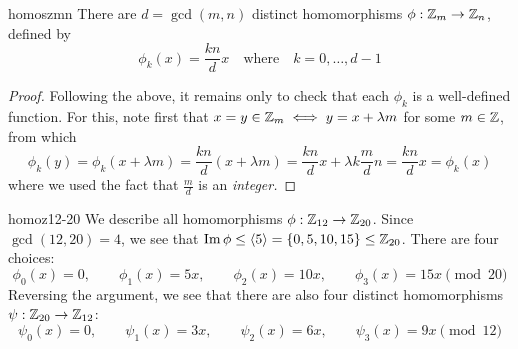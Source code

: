 \begin{cor}{}{homoszmn}
There are $d=\gcd(m,n)$ distinct homomorphisms $\phi:\mathbb{Z}_m\to\mathbb{Z}_n$, defined by
\[\phi_k(x)=\frac{kn}{d}x\quad\text{where}\quad k=0,\ldots,d-1\]
\end{cor}

\begin{proof}
Following the above, it remains only to check that each $\phi_k$ is a well-defined function. For this, note first that $x=y\in\mathbb{Z}_m\iff y=x+\lambda m$ for some $m\in\mathbb{Z}$, from which
\[
\phi_k(y)=\phi_k(x+\lambda m)=\frac{kn}d(x+\lambda m) =\frac{kn}dx+\lambda k\frac mdn=\frac{kn}dx =\phi_k(x)\tag{in $\Z_n$}
\]
where we used the fact that $\frac md$ is an \emph{integer.}
\end{proof}

\goodbreak


\begin{example}{}{homoz12-20}
We describe all homomorphisms $\phi:\mathbb{Z}_{12}\to\mathbb{Z}_{20}$.\smallbreak
Since $\gcd(12,20)=4$, we see that $\operatorname{Im}\phi\le\left\langle 5\right\rangle=\{0,5,10,15\}\le\mathbb{Z}_{20}$. There are four choices:
\[\phi_0(x)=0,\qquad \phi_1(x)=5x,\qquad \phi_2(x)=10x,\qquad \phi_3(x)=15x\pmod{20}\]
Reversing the argument, we see that there are also four distinct homomorphisms $\psi:\mathbb{Z}_{20}\to\mathbb{Z}_{12}$:
\[\psi_0(x)=0,\qquad \psi_1(x)=3x,\qquad \psi_2(x)=6x,\qquad \psi_3(x)=9x\pmod{12}\]
\end{example} 



